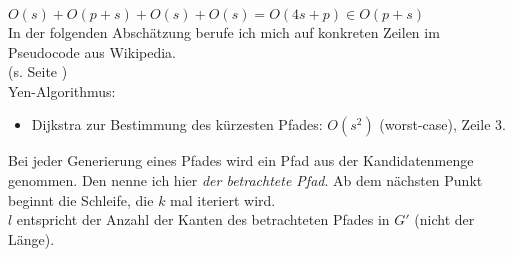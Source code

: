 \documentclass[a4paper,10pt,ngerman]{scrartcl}
\begin{document}
$O(s) + O(p + s) + O(s) + O(s) = O(4s + p) \in O(p + s)$\\

In der folgenden Abschätzung berufe ich mich auf konkreten Zeilen im Pseudocode aus Wikipedia. \\
(s. Seite \pageref{wikipedia.pseudo})\\

Yen-Algorithmus:
\begin{itemize}
  \item Dijkstra zur Bestimmung des kürzesten Pfades: $O(s^2)$ (worst-case), Zeile 3.
\end{itemize}
  Bei jeder Generierung eines Pfades wird ein Pfad aus der Kandidatenmenge genommen. 
  Den nenne ich hier \textit{der betrachtete Pfad}. Ab dem nächsten Punkt beginnt die Schleife,
  die $k$ mal iteriert wird.\\ $l$ entspricht der Anzahl der Kanten des betrachteten Pfades in $G'$ (nicht der Länge).
\end{document}
